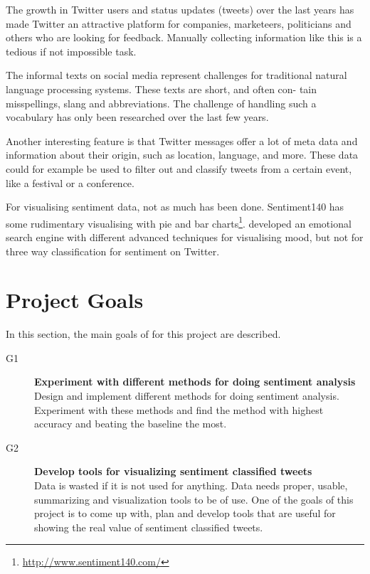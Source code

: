 The growth in Twitter users and status updates (tweets) over the last years has made Twitter an attractive platform for companies, marketeers, politicians and others who are looking for feedback. Manually collecting information like this is a tedious if not impossible task.

The informal texts on social media represent challenges for traditional natural language processing systems. These texts are short, and often con- tain misspellings, slang and abbreviations. The challenge of handling such a vocabulary has only been researched over the last few years.

Another interesting feature is that Twitter messages offer a lot of meta data and information about their origin, such as location, language, and more. These data could for example be used to filter out and classify tweets from a certain event, like a festival or a conference.

For visualising sentiment data, not as much has been done. Sentiment140 has some rudimentary visualising with pie and bar charts\footnote{\url{http://www.sentiment140.com/}}. \cite{article:wefeelfine} developed an emotional search engine with different advanced techniques for visualising mood, but not for three way classification for sentiment on Twitter.

\section{Project Goals}
\label{sec:projectgoals}

In this section, the main goals of for this project are described.

\begin{description}

\item[G1] \textbf{Experiment with different methods for doing sentiment analysis} \\
	Design and implement different methods for doing sentiment analysis. Experiment with these methods and find the method with highest accuracy and beating the baseline the most. 
	
\item[G2] \textbf{Develop tools for visualizing sentiment classified tweets} \\
    Data is wasted if it is not used for anything. Data needs proper, usable, summarizing and visualization tools to be of use. One of the goals of this project is to come up with, plan and develop tools that are useful for showing the real value of sentiment classified tweets. 

\end{description}

